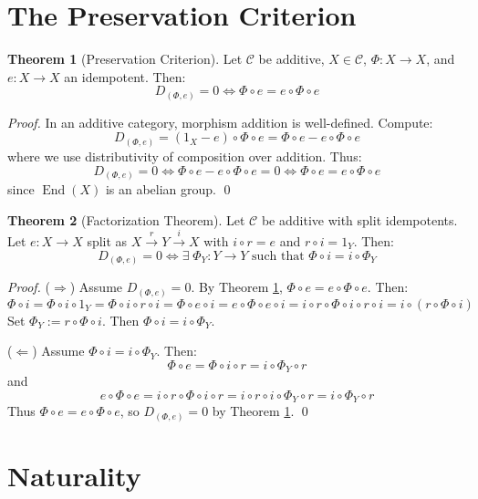 \documentclass[11pt,a4paper]{article}
\theoremstyle{definition}
\newtheorem{theorem}{Theorem}[section]
\begin{document}
\section{The Preservation Criterion}

\begin{theorem}[Preservation Criterion]\label{thm:preservation}
Let $\mathcal{C}$ be additive, $X \in \mathcal{C}$, $\Phi: X \to X$, and $e: X \to X$ an idempotent. Then:
\[
\boxed{D_{(\Phi,e)} = 0 \iff \Phi \circ e = e \circ \Phi \circ e}
\]
\end{theorem}

\begin{proof}
In an additive category, morphism addition is well-defined. Compute:
\[
D_{(\Phi,e)} = (1_X - e) \circ \Phi \circ e = \Phi \circ e - e \circ \Phi \circ e
\]
where we use distributivity of composition over addition. Thus:
\[
D_{(\Phi,e)} = 0 \iff \Phi \circ e - e \circ \Phi \circ e = 0 \iff \Phi \circ e = e \circ \Phi \circ e
\]
since $\operatorname{End}(X)$ is an abelian group. \qed
\end{proof}

\begin{theorem}[Factorization Theorem]\label{thm:factorization}
Let $\mathcal{C}$ be additive with split idempotents. Let $e: X \to X$ split as $X \xrightarrow{r} Y \xrightarrow{i} X$ with $i \circ r = e$ and $r \circ i = 1_Y$. Then:
\[
D_{(\Phi,e)} = 0 \iff \exists \; \Phi_Y: Y \to Y \text{ such that } \Phi \circ i = i \circ \Phi_Y
\]
\end{theorem}

\begin{proof}
($\Rightarrow$) Assume $D_{(\Phi,e)} = 0$. By Theorem \ref{thm:preservation}, $\Phi \circ e = e \circ \Phi \circ e$. Then:
\[
\Phi \circ i = \Phi \circ i \circ 1_Y = \Phi \circ i \circ r \circ i = \Phi \circ e \circ i = e \circ \Phi \circ e \circ i = i \circ r \circ \Phi \circ i \circ r \circ i = i \circ (r \circ \Phi \circ i)
\]
Set $\Phi_Y := r \circ \Phi \circ i$. Then $\Phi \circ i = i \circ \Phi_Y$.

($\Leftarrow$) Assume $\Phi \circ i = i \circ \Phi_Y$. Then:
\[
\Phi \circ e = \Phi \circ i \circ r = i \circ \Phi_Y \circ r
\]
and
\[
e \circ \Phi \circ e = i \circ r \circ \Phi \circ i \circ r = i \circ r \circ i \circ \Phi_Y \circ r = i \circ \Phi_Y \circ r
\]
Thus $\Phi \circ e = e \circ \Phi \circ e$, so $D_{(\Phi,e)} = 0$ by Theorem \ref{thm:preservation}. \qed
\end{proof}

\section{Naturality}
\end{document}
